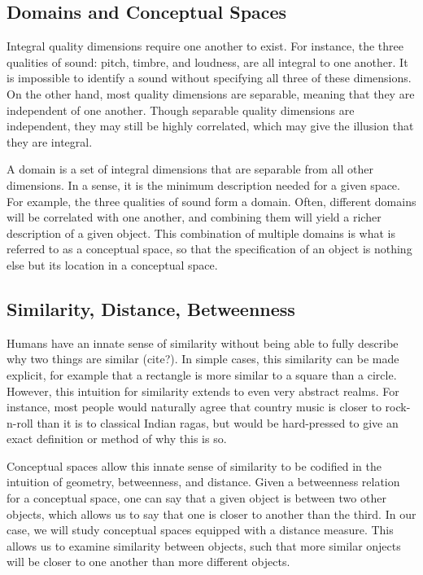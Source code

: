 \subsection{Domains and Conceptual Spaces}
\label{subsection:domains-and-conceptual-spaces}

Integral quality dimensions require one another to exist.  For instance, the three qualities of sound: pitch, timbre, and loudness, are all integral to one another.  It is impossible to identify a sound without specifying all three of these dimensions.  On the other hand, most quality dimensions are separable, meaning that they are independent of one another.  Though separable quality dimensions are independent, they may still be highly correlated, which may give the illusion that they are integral.

A domain is a set of integral dimensions that are separable from all other dimensions.  In a sense, it is the minimum description needed for a given space.  For example, the three qualities of sound form a domain.  Often, different domains will be correlated with one another, and combining them will yield a richer description of a given object.  This combination of multiple domains is what is referred to as a conceptual space, so that the specification of an object is nothing else but its location in a conceptual space.

\subsection{Similarity, Distance, Betweenness}
\label{subsection:similarity-distance-betweenness}

Humans have an innate sense of similarity without being able to fully describe why two things are similar (cite?).  In simple cases, this similarity can be made explicit, for example that a rectangle is more similar to a square than a circle.  However, this intuition for similarity extends to even very abstract realms.  For instance, most people would naturally agree that country music is closer to rock-n-roll than it is to classical Indian ragas, but would be hard-pressed to give an exact definition or method of why this is so.

Conceptual spaces allow this innate sense of similarity to be codified in the intuition of geometry, betweenness, and distance.  Given a betweenness relation for a conceptual space, one can say that a given object is between two other objects, which allows us to say that one is closer to another than the third.  In our case, we will study conceptual spaces equipped with a distance measure.  This allows us to examine similarity between objects, such that more similar onjects will be closer to one another than more different objects.

